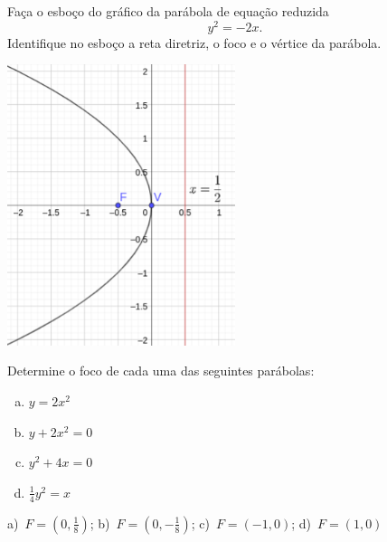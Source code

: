 \begin{exer}
  Faça o esboço do gráfico da parábola de equação reduzida
  \begin{equation}
    y^2 = -2x.
  \end{equation}
  Identifique no esboço a reta diretriz, o foco e o vértice da parábola.
\end{exer}
\begin{resp}
  \includegraphics[width=0.5\textwidth]{cap_conicas/dados/fig_parabola_exer_y2-2x/fig}
\end{resp}

\begin{exer}
  Determine o foco de cada uma das seguintes parábolas:
  \begin{enumerate}[a)]
  \item $y = 2x^2$
  \item $y + 2x^2 = 0$
  \item $y^2 + 4x = 0$
  \item $\frac{1}{4}y^2 = x$
  \end{enumerate}
\end{exer}
\begin{resp}
  a)~$F=(0, \frac{1}{8})$; b)~$F=(0, -\frac{1}{8})$; c)~$F=(-1, 0)$; d)~$F=(1, 0)$
\end{resp}

